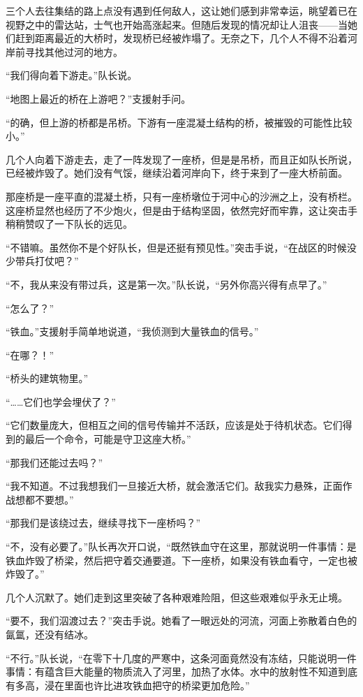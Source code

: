 三个人去往集结的路上点没有遇到任何敌人，这让她们感到非常幸运，眺望着已在视野之中的雷达站，士气也开始高涨起来。但随后发现的情况却让人沮丧——当她们赶到距离最近的大桥时，发现桥已经被炸塌了。无奈之下，几个人不得不沿着河岸前寻找其他过河的地方。

“我们得向着下游走。”队长说。

“地图上最近的桥在上游吧？”支援射手问。

“的确，但上游的桥都是吊桥。下游有一座混凝土结构的桥，被摧毁的可能性比较小。”

几个人向着下游走去，走了一阵发现了一座桥，但是是吊桥，而且正如队长所说，已经被炸毁了。她们没有气馁，继续沿着河岸向下，终于来到了一座大桥前面。

那座桥是一座平直的混凝土桥，只有一座桥墩位于河中心的沙洲之上，没有桥栏。这座桥显然也经历了不少炮火，但是由于结构坚固，依然完好而牢靠，这让突击手稍稍赞叹了一下队长的远见。

“不错嘛。虽然你不是个好队长，但是还挺有预见性。”突击手说，“在战区的时候没少带兵打仗吧？”

“不，我从来没有带过兵，这是第一次。”队长说，“另外你高兴得有点早了。”

“怎么了？”

“铁血。”支援射手简单地说道，“我侦测到大量铁血的信号。”

“在哪？！”

“桥头的建筑物里。”

“……它们也学会埋伏了？”

“它们数量庞大，但相互之间的信号传输并不活跃，应该是处于待机状态。它们得到的最后一个命令，可能是守卫这座大桥。”

“那我们还能过去吗？”

“我不知道。不过我想我们一旦接近大桥，就会激活它们。敌我实力悬殊，正面作战想都不要想。”

“那我们是该绕过去，继续寻找下一座桥吗？”

“不，没有必要了。”队长再次开口说，“既然铁血守在这里，那就说明一件事情：是铁血炸毁了桥梁，然后把守着交通要道。下一座桥，如果没有铁血看守，一定也被炸毁了。”

几个人沉默了。她们走到这里突破了各种艰难险阻，但这些艰难似乎永无止境。

“要不，我们泅渡过去？”突击手说。她看了一眼远处的河流，河面上弥散着白色的氤氲，还没有结冰。

“不行。”队长说，“在零下十几度的严寒中，这条河面竟然没有冻结，只能说明一件事情：有蕴含巨大能量的物质流入了河里，加热了水体。水中的放射性不知道到底有多高，浸在里面也许比进攻铁血把守的桥梁更加危险。”

